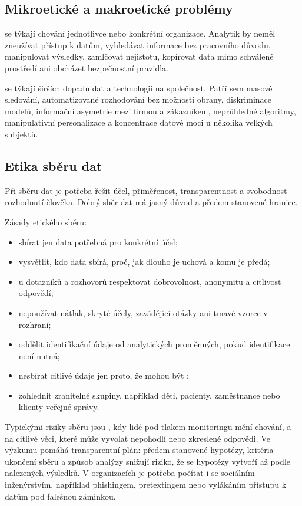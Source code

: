 \subsection{Mikroetické a makroetické problémy}
 se týkají chování jednotlivce nebo konkrétní organizace. Analytik by
neměl zneužívat přístup k datům, vyhledávat informace bez pracovního důvodu, manipulovat výsledky,
zamlčovat nejistotu, kopírovat data mimo schválené prostředí ani obcházet bezpečnostní pravidla.

 se týkají širších dopadů dat a technologií na společnost. Patří sem
masové sledování, automatizované rozhodování bez možnosti obrany, diskriminace modelů, informační
asymetrie mezi firmou a zákazníkem, neprůhledné algoritmy, manipulativní personalizace a koncentrace
datové moci u několika velkých subjektů.

\subsection{Etika sběru dat}
Při sběru dat je potřeba řešit účel, přiměřenost, transparentnost a svobodnost rozhodnutí člověka.
Dobrý sběr dat má jasný důvod a předem stanovené hranice.

Zásady etického sběru:
\begin{itemize}
  \item sbírat jen data potřebná pro konkrétní účel;
  \item vysvětlit, kdo data sbírá, proč, jak dlouho je uchová a komu je předá;
  \item u dotazníků a rozhovorů respektovat dobrovolnost, anonymitu a citlivost odpovědí;
  \item nepoužívat nátlak, skryté účely, zavádějící otázky ani tmavé vzorce v rozhraní;
  \item oddělit identifikační údaje od analytických proměnných, pokud identifikace není nutná;
  \item nesbírat citlivé údaje jen proto, že mohou být ;
  \item zohlednit zranitelné skupiny, například děti, pacienty, zaměstnance nebo klienty veřejné správy.
\end{itemize}

Typickými riziky sběru jsou , kdy lidé pod tlakem monitoringu mění chování, a
 na citlivé věci, které může vyvolat nepohodlí nebo zkreslené odpovědi.
Ve výzkumu pomáhá transparentní plán: předem stanovené hypotézy, kritéria ukončení sběru a způsob
analýzy snižují riziko, že se hypotézy vytvoří až podle nalezených výsledků. V organizacích je potřeba
počítat i se sociálním inženýrstvím, například phishingem, pretextingem nebo vylákáním přístupu k
datům pod falešnou záminkou.

